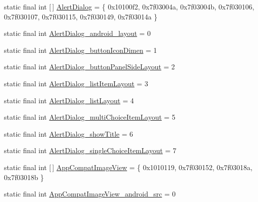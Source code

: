 \begin{DoxyCompactItemize}
\item 
static final int \mbox{[}$\,$\mbox{]} \mbox{\hyperlink{classcom_1_1synnapps_1_1carouselview_1_1_r_1_1styleable_acfeebbc3f8dd27d8095374264f038c79}{Alert\+Dialog}} = \{ 0x10100f2, 0x7f03004a, 0x7f03004b, 0x7f030106, 0x7f030107, 0x7f030115, 0x7f030149, 0x7f03014a \}
\item 
static final int \mbox{\hyperlink{classcom_1_1synnapps_1_1carouselview_1_1_r_1_1styleable_aea08bdcea74ae759f83a8a24c7421f86}{Alert\+Dialog\+\_\+android\+\_\+layout}} = 0
\item 
static final int \mbox{\hyperlink{classcom_1_1synnapps_1_1carouselview_1_1_r_1_1styleable_aea853ab7296f3a6617b3eaf6f9aa72b7}{Alert\+Dialog\+\_\+button\+Icon\+Dimen}} = 1
\item 
static final int \mbox{\hyperlink{classcom_1_1synnapps_1_1carouselview_1_1_r_1_1styleable_a55366b5fa9fc30ea0e5ce546ac4896ad}{Alert\+Dialog\+\_\+button\+Panel\+Side\+Layout}} = 2
\item 
static final int \mbox{\hyperlink{classcom_1_1synnapps_1_1carouselview_1_1_r_1_1styleable_a338881c1a2b1a32718495d35ced11dba}{Alert\+Dialog\+\_\+list\+Item\+Layout}} = 3
\item 
static final int \mbox{\hyperlink{classcom_1_1synnapps_1_1carouselview_1_1_r_1_1styleable_a30ed35c57ad69b00a2364afc7530f46f}{Alert\+Dialog\+\_\+list\+Layout}} = 4
\item 
static final int \mbox{\hyperlink{classcom_1_1synnapps_1_1carouselview_1_1_r_1_1styleable_aec31a633f08f493b73b65ce48a7f7410}{Alert\+Dialog\+\_\+multi\+Choice\+Item\+Layout}} = 5
\item 
static final int \mbox{\hyperlink{classcom_1_1synnapps_1_1carouselview_1_1_r_1_1styleable_a9fef17f2667417cfd11d3bdd7c32c8f1}{Alert\+Dialog\+\_\+show\+Title}} = 6
\item 
static final int \mbox{\hyperlink{classcom_1_1synnapps_1_1carouselview_1_1_r_1_1styleable_a538d90bdd3ce8e157541ba51a7ace3b5}{Alert\+Dialog\+\_\+single\+Choice\+Item\+Layout}} = 7
\item 
static final int \mbox{[}$\,$\mbox{]} \mbox{\hyperlink{classcom_1_1synnapps_1_1carouselview_1_1_r_1_1styleable_aca9a29186fcd3ae32722e4c15432d1d0}{App\+Compat\+Image\+View}} = \{ 0x1010119, 0x7f030152, 0x7f03018a, 0x7f03018b \}
\item 
static final int \mbox{\hyperlink{classcom_1_1synnapps_1_1carouselview_1_1_r_1_1styleable_af56060f70beabc7b75f8c0480b9d8c31}{App\+Compat\+Image\+View\+\_\+android\+\_\+src}} = 0
\item 

\end{DoxyCompactItemize}
